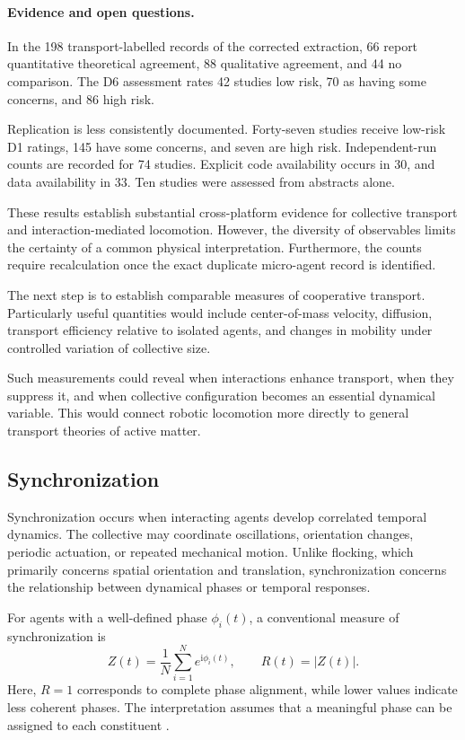 \paragraph*{Evidence and open questions.}

In the 198 transport-labelled records
of the corrected extraction, 66 report
quantitative theoretical agreement,
88 qualitative agreement, and
44 no comparison. The D6 assessment
rates 42 studies low risk,
70 as having some concerns,
and 86 high risk.

Replication is less consistently documented.
Forty-seven studies receive low-risk
D1 ratings, 145 have some concerns,
and seven are high risk.
Independent-run counts are recorded
for 74 studies. Explicit code
availability occurs in 30,
and data availability in 33.
Ten studies were assessed
from abstracts alone.

These results establish substantial
cross-platform evidence for collective
transport and interaction-mediated
locomotion. However, the diversity
of observables limits the certainty
of a common physical interpretation.
Furthermore, the counts require
recalculation once the exact
duplicate micro-agent record
is identified.

The next step is to establish
comparable measures of cooperative
transport. Particularly useful
quantities would include
center-of-mass velocity,
diffusion, transport efficiency
relative to isolated agents,
and changes in mobility
under controlled variation
of collective size.

Such measurements could reveal
when interactions enhance
transport, when they suppress
it, and when collective
configuration becomes an
essential dynamical variable.
This would connect robotic
locomotion more directly
to general transport
theories of active matter.

\subsection{Synchronization}
\label{sec:phenomena-synchronization}

Synchronization occurs when interacting agents
develop correlated temporal dynamics.
The collective may coordinate oscillations,
orientation changes, periodic actuation,
or repeated mechanical motion.
Unlike flocking, which primarily concerns
spatial orientation and translation,
synchronization concerns the relationship
between dynamical phases or temporal responses.

For agents with a well-defined phase
$\phi_i(t)$, a conventional measure
of synchronization is
\begin{equation}
Z(t)=
\frac{1}{N}
\sum_{i=1}^{N}e^{\mathrm{i}\phi_i(t)},
\qquad
R(t)=|Z(t)|.
\label{eq:phenomena-sync}
\end{equation}
Here, $R=1$ corresponds to complete
phase alignment, while lower values
indicate less coherent phases.
The interpretation assumes that a
meaningful phase can be assigned
to each constituent
\cite{Acebron2005kuramoto}.

